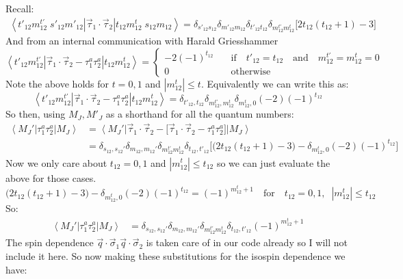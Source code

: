 \documentclass[11pt]{article}
\newcommand{\br}[1]{\left\langle #1 \right |}
\newcommand{\kt}[1]{\left| #1 \right \rangle}
\newcommand{\ot}{_{12}}
\newcommand{\tot}{t_{12}}
\newcommand{\totp}{t'_{12}}
\begin{document}
Recall:
\begin{align}
\br{t'_{12} m_{12}^{t'}\;s'_{12} m'_{12}}\vec{\tau}_1\cdot \vec{\tau}_2 \kt{t_{12} m_{12}^t\;s_{12} m_{12}}= \delta_{s'\ot s\ot} \delta_{m'\ot m\ot} \delta_{t'\ot t\ot}\delta_{m^{t'}\ot m^{t}\ot}\bigg[2 t_{12} (t_{12} +1) -3\bigg]
\end{align}
And from an internal communication with Harald Griesshammer 
\begin{equation}
\br{t'_{12} m_{12}^{t'}}\vec{\tau}_1\cdot \vec{\tau}_2 - \tau_1^a \tau_2^a \kt{t_{12} m_{12}^t}=
\left\{
\begin{array}{ll}
    -2 (-1)^{t\ot}&\quad\text{if}\quad t'\ot=t\ot\quad\text{and}\quad m^{t'}\ot =m^{t}\ot=0\\
    0&\quad\text{otherwise}
\end{array}
\right.
\end{equation}
Note the above holds for $t=0,1$ and $|m^t\ot|\leq t$.
Equivalently we can write this as:
\begin{equation}
\br{t'_{12} m_{12}^{t'}}\vec{\tau}_1\cdot \vec{\tau}_2 - \tau_1^a \tau_2^a \kt{t_{12} m_{12}^t}=
\delta_{t'\ot,t\ot} \delta_{m^{t'}\ot, m^t\ot} \delta_{m^t\ot,0}(-2)(-1)^{t\ot}
\end{equation}
So then, using $M_J, M'_J$ as a shorthand for all the quantum numbers:
\begin{align}
    \br{M_J'}\tau_1^a \tau_2^a \kt{M_J}&= \br{M_J'}\vec{\tau}_1 \cdot \vec{\tau}_2-\big[\vec{\tau}_1 \cdot \vec{\tau}_2 - \tau_1^a \tau_2^a \big] \kt{M_J}\\
                                       &=\delta_{s\ot,s\ot'}\delta_{m\ot,m\ot'}\delta_{m_{12}^{t'}{m_{12}^{t}}} \delta_{\tot,\totp} \Bigg[ \big( 2 t_{12} \left( \tot+1 \right) -3\big) - \delta_{m_{12}^t ,0} \left( -2 \right) (-1)^{t_{12}}\Bigg]
\end{align}
Now we only care about $t_{12}=0,1$ and $|m^t\ot|\leq t\ot$ so we can just evaluate the above for those cases.
\begin{equation}
    \big( 2 t_{12} \left( \tot+1 \right) -3\big) - \delta_{m_{12}^t ,0} \left( -2 \right) (-1)^{t_{12}}= (-1)^{m\ot^t+1}\quad
    \text{for}\quad t_{12}=0,1,\;\;|m^t\ot|\leq t\ot
\end{equation}
So:
\begin{align}
    \br{M_J'}\tau_1^a \tau_2^a \kt{M_J}&= \delta_{s\ot,s\ot'}\delta_{m\ot,m\ot'}\delta_{m_{12}^{t'}{m_{12}^{t}}} \delta_{\tot,\totp} (-1)^{m^t\ot+1}
\end{align}
The spin dependence $\vec{q}\cdot \vec{\sigma}_1 \vec{q}\cdot \vec{\sigma}_2$ is taken care of in our code already so I will not include it here. So now making these substitutions for the isospin dependence we have:
\end{document}
